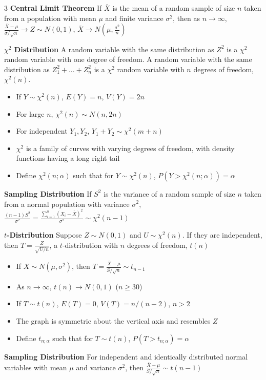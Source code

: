 \documentclass[10pt, landscape]{article}
\begin{document}
\begin{multicols*}{3}
\textbf{Central Limit Theorem} If $\overline{X}$ is the mean of a random sample of size $n$ taken from a population with mean $\mu$ and finite variance $\sigma^2$, then as $n \rightarrow\infty$, $\frac{\overline{X}-\mu}{\sigma/\sqrt{n}}\rightarrow Z \sim N(0, 1)$, $\overline{X}\rightarrow N(\mu, \frac{\sigma^2}{n})$

\textbf{$\chi^2$ Distribution} A random variable with the same distribution as $Z^2$ is a $\chi^2$ random variable with one degree of freedom. A random variable with the same distribution as $Z_1^2+...+Z_n^2$ is a $\chi^2$ random variable with $n$ degrees of freedom, $\chi^2(n)$.
\begin{itemize}
    \item If $Y\sim \chi^2(n)$, $E(Y)=n$, $V(Y)=2n$
    \item For large $n$, $\chi^2(n)\sim N(n, 2n)$
    \item For independent $Y_1, Y_2$, $Y_1+Y_2\sim\chi^2(m+n)$
    \item $\chi^2$ is a family of curves with varying degrees of freedom, with density functions having a long right tail
    \item Define $\chi^2(n;\alpha)$ such that for $Y \sim \chi^2(n)$, $P(Y > \chi^2(n;\alpha))=\alpha$
\end{itemize}

\textbf{Sampling Distribution} If $S^2$ is the variance of a random sample of size $n$ taken from a normal population with variance $\sigma^2$, $\frac{(n-1)S^2}{\sigma^2}=\frac{\sum_{i=1}^n(X_i-\overline{X})^2}{\sigma^2}\sim\chi^2(n-1)$

\textbf{$t$-Distribution} Suppose $Z \sim N(0, 1)$ and $U \sim \chi^2(n)$. If they are independent, then $T=\frac{Z}{\sqrt{U/n}}$, a $t$-distribution with $n$ degrees of freedom, $t(n)$
\begin{itemize}
    \item If $X \sim N(\mu, \sigma^2)$, then $T = \frac{\bar{X} - \mu}{S/\sqrt{n}} \sim t_{n-1}$
    \item As $n\rightarrow\infty$, $t(n)\rightarrow N(0, 1)$ ($n \geq 30$)
    \item If $T \sim t(n)$, $E(T)=0$, $V(T)=n/(n-2)$, $n>2$
    \item The graph is symmetric about the vertical axis and resembles $Z$
    \item Define $t_{n;\alpha}$ such that for $T \sim t(n)$, $P(T>t_{n;\alpha})=\alpha$
\end{itemize}

\textbf{Sampling Distribution} For independent and identically distributed normal variables with mean $\mu$ and variance $\sigma^2$, then $\frac{\overline{X}-\mu}{S/\sqrt{n}}\sim t(n-1)$


\end{multicols*}
\end{document}
